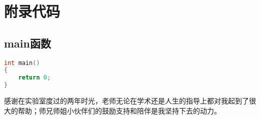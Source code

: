 \documentclass[winfonts,master,twoside,AutoFakeBold= {2}]{njuthesis}
\begin{document}















\appendix
\chapter{附录代码}\label{app:1}
\section{main函数}
\begin{lstlisting}[language=C]
int main()
{
	return 0;
}
\end{lstlisting}


\begin{acknowledgement}
	感谢在实验室度过的两年时光，老师无论在学术还是人生的指导上都对我起到了很大的帮助；师兄师姐小伙伴们的鼓励支持和陪伴是我坚持下去的动力。
\end{acknowledgement}
\end{document}
